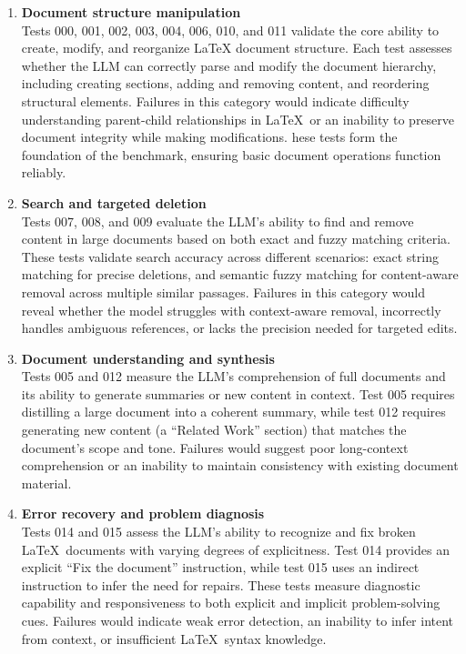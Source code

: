 \begin{enumerate}
\item \textbf{Document structure manipulation} \\ 
    Tests 000, 001, 002, 003, 004, 006, 010, and 011 validate the core ability to create, modify, and reorganize LaTeX document structure.
    Each test assesses whether the LLM can correctly parse and modify the document hierarchy, including creating sections, adding and removing content, and reordering structural elements.
    Failures in this category would indicate difficulty understanding parent-child relationships in \LaTeX\ or an inability to preserve document integrity while making modifications. 
    hese tests form the foundation of the benchmark, ensuring basic document operations function reliably.
\item \textbf{Search and targeted deletion} \\ 
    Tests 007, 008, and 009 evaluate the LLM's ability to find and remove content in large documents based on both exact and fuzzy matching criteria.
    These tests validate search accuracy across different scenarios: exact string matching for precise deletions, and semantic fuzzy matching for content-aware removal across multiple similar passages.
    Failures in this category would reveal whether the model struggles with context-aware removal, incorrectly handles ambiguous references, or lacks the precision needed for targeted edits.
\item \textbf{Document understanding and synthesis} \\
    Tests 005 and 012 measure the LLM's comprehension of full documents and its ability to generate summaries or new content in context. Test 005 requires distilling a large document into a coherent summary, while test 012 requires generating new content (a ``Related Work'' section) that matches the document's scope and tone. Failures would suggest poor long-context comprehension or an inability to maintain consistency with existing document material.
\item \textbf{Error recovery and problem diagnosis} \\ 
    Tests 014 and 015 assess the LLM's ability to recognize and fix broken \LaTeX\ documents with varying degrees of explicitness.
    Test 014 provides an explicit ``Fix the document'' instruction, while test 015 uses an indirect instruction to infer the need for repairs.
    These tests measure diagnostic capability and responsiveness to both explicit and implicit problem-solving cues.
    Failures would indicate weak error detection, an inability to infer intent from context, or insufficient \LaTeX\ syntax knowledge.

\end{enumerate}
